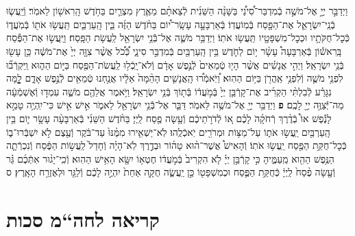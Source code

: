 \documentclass[twoside, openany, parskip=half, 11pt]{book}
\begin{document}
\begin{footnotesize}
\begin{multicols}{2}
\\
\\
וַיְדַבֵּ֣ר יְיָ֣ אֶל־מֹשֶׁ֣ה בְֿמִדְבַּר־סִ֠ינַ֠י בַּשָּׁנָ֨ה הַשֵּׁנִ֜ית לְֿצֵאתָ֨ם מֵאֶ֧רֶץ מִצְרַ֛יִם בַּחֹ֥דֶשׁ הָֽרִאשׁ֖וֹן לֵאמֹֽר׃ וְֿיַֽעֲשׂ֧וּ בְֿנֵֽי־יִשְׂרָאֵ֛ל אֶת־הַפָּ֖סַח בְּֿמֽוֹעֲדֽוֹ׃ בְּֿאַרְבָּעָ֣ה עָשָֽׂר־י֠וֹם בַּחֹ֨דֶשׁ הַזֶּ֜ה בֵּ֧ין הָֽעַרְבַּ֛יִם תַּֽעֲשׂ֥וּ אֹת֖וֹ בְּֿמֹֽעֲד֑וֹ כְּֿכׇל־חֻקֹּתָ֥יו וּכְכׇל־מִשְׁפָּטָ֖יו תַּֽעֲשׂ֥וּ אֹתֽוֹ׃ וַיְדַבֵּ֥ר מֹשֶׁ֛ה אֶל־בְּֿֿנֵ֥י יִשְׂרָאֵ֖ל לַֽעֲשׂ֥ת הַפָּֽסַח׃ וַיַּֽעֲשׂ֣וּ אֶת־הַפֶּ֡סַח בָּֽרִאשׁ֡וֹן בְּֿאַרְבָּעָה֩ עָשָׂ֨ר י֥וֹם לַחֹ֛דֶשׁ בֵּ֥ין הָֽעַרְבַּ֖יִם בְּֿמִדְבַּ֣ר סִינָ֑י כְּֿ֠כֹ֠ל אֲשֶׁ֨ר צִוָּ֤ה יְיָ֙ אֶת־מֹשֶׁ֔ה כֵּ֥ן עָשׂ֖וּ בְּֿנֵ֥י יִשְׂרָאֵֽל׃
וַיְהִ֣י אֲנָשִׁ֗ים אֲשֶׁ֨ר הָי֤וּ טְֿמֵאִים֙ לְֿנֶ֣פֶשׁ אָדָ֔ם וְֿלֹא־יָֽכְֿל֥וּ לַֽעֲשֹׂת־הַפֶּ֖סַח בַּיּ֣וֹם הַה֑וּא וַֽיִּקְרְֿב֞וּ לִפְנֵ֥י מֹשֶׁ֛ה וְֿלִפְנֵ֥י אַֽהֲרֹ֖ן בַּיּ֥וֹם הַהֽוּא׃ וַ֠יֹּֽאמְֿר֠וּ הָֽאֲנָשִׁ֤ים הָהֵ֨מָּה֙ אֵלָ֔יו אֲנַ֥חְנוּ טְֿמֵאִ֖ים לְֿנֶ֣פֶשׁ אָדָ֑ם לׇׇׇׇׇׇָ֣מָּה נִגָּרַ֗ע לְֿבִלְתִּ֨י הַקְרִ֜יב אֶת־קָרְֿבַּ֤ן יְיָ֙ בְּֿמֹ֣עֲד֔וֹ בְּֿת֖וֹךְ בְּֿנֵ֥י יִשְׂרָאֵֽל׃ וַיֹּ֥אמֶר אֲלֵהֶ֖ם מֹשֶׁ֑ה עִמְד֣וּ וְֿאֶשְׁמְֿעָ֔ה מַה־יְּֿֿצַוֶּ֥ה יְיָ֖ לָכֶֽם׃ \textbf{פ}
וַיְדַבֵּ֥ר יְיָ֖ אֶל־מֹשֶׁ֥ה לֵּאמֹֽר׃ דַּבֵּ֛ר אֶל־בְּֿֿנֵ֥י יִשְׂרָאֵ֖ל לֵאמֹ֑ר אִ֣ישׁ אִ֣ישׁ כִּי־יִֽהְיֶ֥ה טָמֵ֣א לָנֶ֡פֶשׁ אוֹ֩ בְֿדֶ֨רֶךְ רְֿחֹקָ֜הֹ לָכֶ֗ם א֚וֹ לְֿדֹרֹ֣תֵיכֶ֔ם וְֿעָ֥שָׂה פֶ֖סַח לַֽיְיָ׃ בַּחֹ֨דֶשׁ הַשֵּׁנִ֜י בְּֿאַרְבָּעָ֨ה עָשָׂ֥ר י֛וֹם בֵּ֥ין הָֽעַרְבַּ֖יִם יַֽעֲשׂ֣וּ אֹת֑וֹ עַל־מַצּ֥וֹת וּמְרֹרִ֖ים יֹֽאכְֿלֻֽהוּ׃ לֹֽא־יַשְׁאִ֤ירוּ מִמֶּ֨נּוּ֙ עַד־בֹּ֔קֶר וְֿעֶ֖צֶם לֹ֣א יִשְׁבְּֿרוּ־ב֑וֹ כְּֿכׇל־חֻקַּ֥ת הַפֶּ֖סַח יַֽעֲשׂ֥וּ אֹתֽוֹ׃ וְֿהָאִישׁ֩ אֲשֶׁר־ה֨וּא טָה֜וֹר וּבְדֶ֣רֶךְ לֹֽא־הָיָ֗ה וְֿחָדַל֙ לַֽעֲשׂ֣וֹת הַפֶּ֔סַח וְֿנִכְרְֿתָ֛ה הַנֶּ֥פֶשׁ הַהִ֖וא מֵֽעַמֶּ֑יהָ כִּ֣י קָרְֿבַּ֣ן יְיָ֗ לֹ֤א הִקְרִיב֙ בְּֿמֹ֣עֲד֔וֹ חֶטְא֥וֹ יִשָּׂ֖א הָאִ֥ישׁ הַהֽוּא׃ וְֿכִֽי־יָג֨וּר אִתְּֿכֶ֜ם גֵּ֗ר וְֿעָ֤שָׂה פֶ֨סַח֙ לַֽיְיָ֔ כְּֿחֻקַּ֥ת הַפֶּ֛סַח וּכְמִשְׁפָּט֖וֹ כֵּ֣ן יַֽעֲשֶׂ֑ה חֻקָּ֤ה אַחַת֙ יִהְיֶ֣ה לָכֶ֔ם וְֿלַגֵּ֖ר וּלְאֶזְרַ֥ח הָאָֽרֶץ׃ ס

\end{multicols}

\clearpage

\section[חה“מ סכות]{קריאה לחה“מ סכות}


\end{footnotesize}
\end{document}
